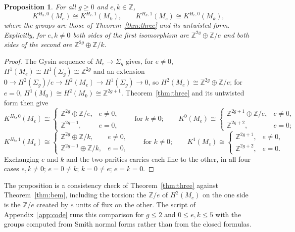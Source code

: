 \documentclass[reqno,11pt]{amsart}
\newtheorem{proposition}[theorem]{Proposition}
\theoremstyle{definition}
\newcommand{\ZZ}{\mathbb{Z}}
\begin{document}
\begin{proposition}\label{prop:tdualcheck}
For all $g\ge0$ and $e,k\in\ZZ$,
\[
K^{H_k,0}(M_e)\cong K^{H_e,1}(M_k),\qquad K^{H_k,1}(M_e)\cong K^{H_e,0}(M_k),
\]
where the groups are those of Theorem~\ref{thm:three} and its untwisted form. Explicitly, for $e,k\ne0$ both sides of the first isomorphism are $\ZZ^{2g}\oplus\ZZ/e$ and both sides of the second are $\ZZ^{2g}\oplus\ZZ/k$.
\end{proposition}

\begin{proof}
The Gysin sequence of $M_e\to\Sigma_g$ gives, for $e\neq0$, $H^1(M_e)\cong H^1(\Sigma_g)\cong\ZZ^{2g}$ and an extension $0\to H^2(\Sigma_g)/e\to H^2(M_e)\to H^1(\Sigma_g)\to0$, so $H^2(M_e)\cong\ZZ^{2g}\oplus\ZZ/e$; for $e=0$, $H^1(M_0)\cong H^2(M_0)\cong\ZZ^{2g+1}$. Theorem~\ref{thm:three} and its untwisted form then give
\[
K^{H_k,0}(M_e)\cong\begin{cases}\ZZ^{2g}\oplus\ZZ/e,&e\ne0,\\ \ZZ^{2g+1},&e=0,\end{cases}\qquad\text{for }k\ne0;\qquad
K^{0}(M_e)\cong\begin{cases}\ZZ^{2g+1}\oplus\ZZ/e,&e\ne0,\\ \ZZ^{2g+2},&e=0;\end{cases}
\]
\[
K^{H_k,1}(M_e)\cong\begin{cases}\ZZ^{2g}\oplus\ZZ/k,&e\ne0,\\ \ZZ^{2g+1}\oplus\ZZ/k,&e=0,\end{cases}\qquad\text{for }k\ne0;\qquad
K^{1}(M_e)\cong\begin{cases}\ZZ^{2g+1},&e\ne0,\\ \ZZ^{2g+2},&e=0.\end{cases}
\]
Exchanging $e$ and $k$ and the two parities carries each line to the other, in all four cases $e,k\ne0$; $e=0\ne k$; $k=0\ne e$; $e=k=0$.
\end{proof}

The proposition is a consistency check of Theorem~\ref{thm:three} against Theorem~\ref{thm:bem}, including the torsion: the $\ZZ/e$ of $H^2(M_e)$ on the one side is the $\ZZ/e$ created by $e$ units of flux on the other. The script of Appendix~\ref{app:code} runs this comparison for $g\le2$ and $0\le e,k\le5$ with the groups computed from Smith normal forms rather than from the closed formulas.
\end{document}
